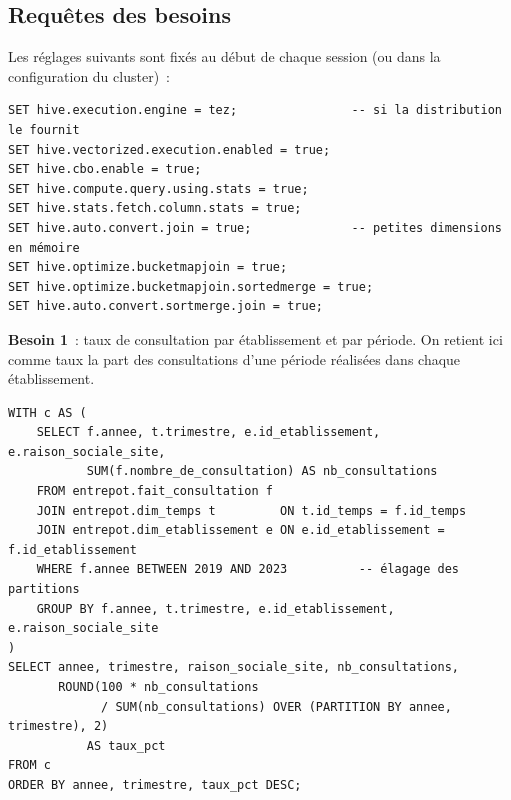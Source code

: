 \subsection{Requêtes des besoins}\label{sec:requetes}

\noindent Les réglages suivants sont fixés au début de chaque session (ou dans la configuration du cluster)~:

\begin{center}
\begin{minipage}{0.92\textwidth}
\begin{tcolorbox}[colback=title2!6,colframe=title1,boxsep=2pt]
\begin{verbatim}
SET hive.execution.engine = tez;                -- si la distribution le fournit
SET hive.vectorized.execution.enabled = true;
SET hive.cbo.enable = true;
SET hive.compute.query.using.stats = true;
SET hive.stats.fetch.column.stats = true;
SET hive.auto.convert.join = true;              -- petites dimensions en mémoire
SET hive.optimize.bucketmapjoin = true;
SET hive.optimize.bucketmapjoin.sortedmerge = true;
SET hive.auto.convert.sortmerge.join = true;
\end{verbatim}
\end{tcolorbox}
\end{minipage}
\end{center}

\noindent \textbf{Besoin 1}~: taux de consultation par établissement et par période. On retient ici comme taux la part des consultations d'une période réalisées dans chaque établissement.

\begin{center}
\begin{minipage}{0.92\textwidth}
\begin{tcolorbox}[colback=title2!6,colframe=title1,boxsep=2pt]
\begin{verbatim}
WITH c AS (
    SELECT f.annee, t.trimestre, e.id_etablissement, e.raison_sociale_site,
           SUM(f.nombre_de_consultation) AS nb_consultations
    FROM entrepot.fait_consultation f
    JOIN entrepot.dim_temps t         ON t.id_temps = f.id_temps
    JOIN entrepot.dim_etablissement e ON e.id_etablissement = f.id_etablissement
    WHERE f.annee BETWEEN 2019 AND 2023          -- élagage des partitions
    GROUP BY f.annee, t.trimestre, e.id_etablissement, e.raison_sociale_site
)
SELECT annee, trimestre, raison_sociale_site, nb_consultations,
       ROUND(100 * nb_consultations
             / SUM(nb_consultations) OVER (PARTITION BY annee, trimestre), 2)
           AS taux_pct
FROM c
ORDER BY annee, trimestre, taux_pct DESC;
\end{verbatim}
\end{tcolorbox}
\end{minipage}
\end{center}

